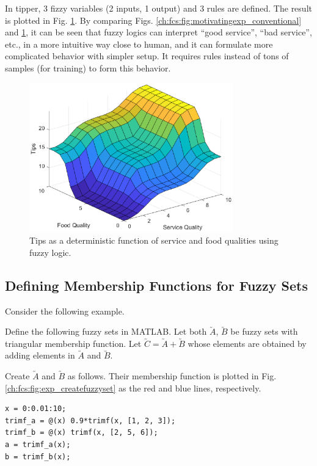 In tipper, 3 fizzy variables (2 inputs, 1 output) and 3 rules are defined. The result is plotted in Fig. \ref{ch:fcs:fig:motivatingexp_fis}. By comparing Figs. \ref{ch:fcs:fig:motivatingexp_conventional} and \ref{ch:fcs:fig:motivatingexp_fis}, it can be seen that fuzzy logics can interpret ``good service'', ``bad service'', etc., in a more intuitive way close to human, and it can formulate more complicated behavior with simpler setup. It requires rules instead of tons of samples (for training) to form this behavior.

\begin{figure}
	\centering
	\includegraphics[width=250pt]{chapters/ch-fuzzy-control-system/figures/motivatingexp_fis.eps}
	\caption{Tips as a deterministic function of service and food qualities using fuzzy logic.} \label{ch:fcs:fig:motivatingexp_fis}
\end{figure}

\subsection{Defining Membership Functions for Fuzzy Sets}

Consider the following example.

\begin{shortbox}
	
	Define the following fuzzy sets in MATLAB. Let both $\utilde{A}$, $\utilde{B}$ be fuzzy sets with triangular membership function. Let $\utilde{C} = \utilde{A} + \utilde{B}$ whose elements are obtained by adding elements in $\utilde{A}$ and $\utilde{B}$.
	
\end{shortbox}

Create $\utilde{A}$ and $\utilde{B}$ as follows. Their membership function is plotted in Fig. \ref{ch:fcs:fig:exp_createfuzzyset} as the red and blue lines, respectively.
\begin{lstlisting}[style=Matlab-editor]
x = 0:0.01:10;
trimf_a = @(x) 0.9*trimf(x, [1, 2, 3]);
trimf_b = @(x) trimf(x, [2, 5, 6]);
a = trimf_a(x);
b = trimf_b(x);
\end{lstlisting}

